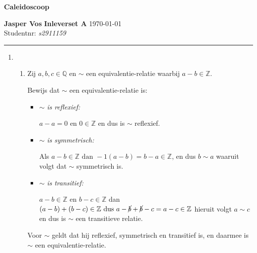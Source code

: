 \documentclass{article}
\newcommand{\tx}[1]{\text{#1}}
\newcommand{\cn}[1]{\cancel{#1}}
\newcommand{\Z}{\mathbb{Z}}
\newcommand{\Q}{\mathbb{Q}}
\newcommand{\en}{\tx{ en }}
\newcommand{\dan}{\tx{ dan }}
\newcommand{\dus}{\tx{ dus }}
\begin{document}
{\Large \textbf{Caleidoscoop}}

\bigskip

\textbf{Jasper Vos} \hfill \textbf{Inleverset A} \hfill \today \\
Studentnr: \emph{s2911159}

\rule{\textwidth}{2pt}

\bigskip

\begin{enumerate}[label=\arabic*]
      \item
            \begin{enumerate}[label=\alph*)]
                  \item
                        Zij \(a, b, c \in \Q \) en \(\sim\) een equivalentie-relatie waarbij \(a - b \in \Z\).

                        Bewijs dat \(\sim\) een equivalentie-relatie is:
                        \begin{itemize}
                              \item \(\sim\)\emph{ is reflexief:}

                                    \(a - a = 0 \en 0 \in \Z \) en dus is \(\sim\) reflexief.
                              \item \(\sim\)\emph{ is symmetrisch:}

                                    Als \(a - b \in \Z \dan -1(a - b) = b - a \in \Z\), en dus \(b \sim a\) waaruit volgt dat \(\sim\) symmetrisch is.
                              \item \(\sim\)\emph{ is transitief:}

                                    \(a-b \in \Z \en b-c \in \Z\) dan \((a-b) + (b-c) \in \Z \dus a -\cn{b} + \cn{b} - c = a-c \in \Z \)
                                    hieruit volgt \(a \sim c\) en dus is \(\sim\) een transitieve relatie.
                        \end{itemize}
                        Voor \(\sim\) geldt dat hij reflexief, symmetrisch en transitief is, en daarmee
                        is \(\sim\) een equivalentie-relatie.


\end{enumerate}
\end{enumerate}
\end{document}
